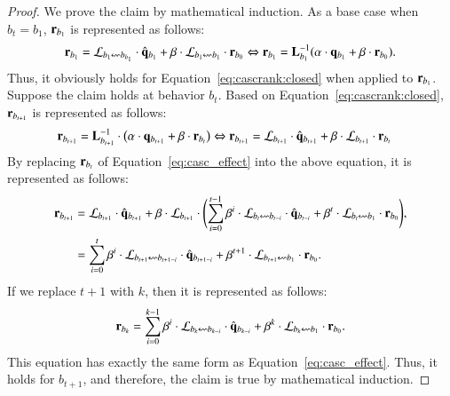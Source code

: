 \begin{proof}
    We prove the claim by mathematical induction.
    As a base case when $b_t = b_1$,  $\mathbf{r}_{b_1}$ is represented as follows:
    \begin{align*}
        \vect{r}_{b_1} = \Linvprod{1}{b_1}\cdot\qindhat{1} + \beta\cdot\Linvprod{1}{1}\cdot\vect{r}_{b_0} \Leftrightarrow \vect{r}_{b_1} = \L^{-1}_{b_1}(\alpha \cdot \vect{q}_{b_1}+\beta \cdot \vect{r}_{b_0}).
    \end{align*}
    Thus, it obviously holds for Equation~\ref{eq:cascrank:closed} when applied to $\mathbf{r}_{b_1}$.
    Suppose the claim holds at behavior $b_t$. 
    Based on Equation~\eqref{eq:cascrank:closed}, $\mathbf{r}_{b_{t+1}}$ is represented as follows:
    \begin{align*}
        \mathbf{r}_{b_{t+1}} &= \mathbf{L}_{b_{t+1}}^{-1} \cdot
    \big(
        \alpha \cdot \mathbf{q}_{b_{t+1}} + \beta \cdot \mathbf{r}_{b_{t}}
    \big) \Leftrightarrow
    \mathbf{r}_{b_{t+1}} = \mathbf{\mathcal{L}}_{b_{t+1}}\cdot{\hat{\mathbf{q}}_{b_{t+1}}} + \beta \cdot \mathbf{\mathcal{L}}_{b_{t+1}}\cdot\mathbf{r}_{b_t}
    \end{align*}
    By replacing $\mathbf{r}_{b_t}$ of Equation~\eqref{eq:casc_effect} into the above equation, it is represented as follows: 
    \begin{align*}
        \vect{r}_{b_{t+1}} &= \Linv_{b_{t+1}}\cdot\qindhat{t+1} + \beta\cdot \Linv_{b_{t+1}}\cdot\Biggl(\sum_{i=0}^{t-1}\beta^{i}\cdot\Linvprod{t}{t-i}\cdot\qindhat{t-i} + \beta^{t}\cdot\Linvprod{t}{1}\cdot\vect{r}_{b_0} \Biggl),\\
         &= \sum_{i=0}^{t}\beta^{i}\cdot\Linvprod{t+1}{t+1-i}\cdot\qindhat{t+1-i} + \beta^{t+1}\cdot\Linvprod{t+1}{1}\cdot\vect{r}_{b_0}.
    \end{align*}
    If we replace $t+1$ with $k$, then it is represented as follows:
    \begin{align*}
        \vect{r}_{b_k} = \sum_{i=0}^{k-1} \beta^{i}\cdot\Linvprod{k}{k-i}\cdot\qindhat{k-i} + \beta^{k}\cdot\Linvprod{k}{1}\cdot\vect{r}_{b_0}. 
    \end{align*}
    This equation has exactly the same form as Equation~\eqref{eq:casc_effect}. 
    Thus, it holds for $b_{t+1}$, and therefore, the claim is true by mathematical induction.
\end{proof}


